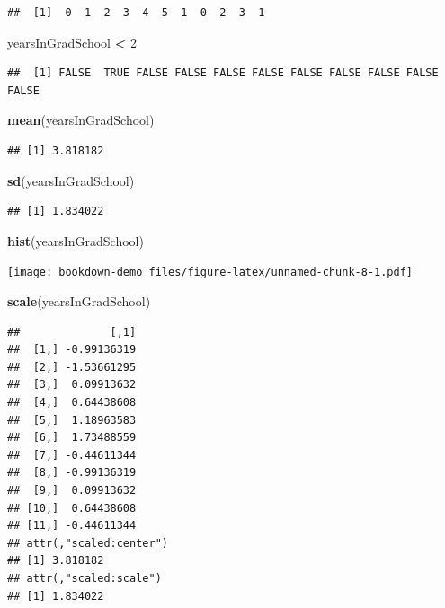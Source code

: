 \documentclass[]{book}
\newenvironment{Shaded}{\begin{snugshade}}{\end{snugshade}}
\newcommand{\KeywordTok}[1]{\textcolor[rgb]{0.13,0.29,0.53}{\textbf{#1}}}
\newcommand{\DecValTok}[1]{\textcolor[rgb]{0.00,0.00,0.81}{#1}}
\newcommand{\StringTok}[1]{\textcolor[rgb]{0.31,0.60,0.02}{#1}}
\newcommand{\OperatorTok}[1]{\textcolor[rgb]{0.81,0.36,0.00}{\textbf{#1}}}
\newcommand{\NormalTok}[1]{#1}
\theoremstyle{definition}
\theoremstyle{definition}
\theoremstyle{definition}
\theoremstyle{remark}
\begin{document}
\begin{verbatim}
##  [1]  0 -1  2  3  4  5  1  0  2  3  1
\end{verbatim}

\begin{Shaded}
\begin{Highlighting}[]
\NormalTok{yearsInGradSchool }\OperatorTok{<}\StringTok{ }\DecValTok{2}
\end{Highlighting}
\end{Shaded}

\begin{verbatim}
##  [1] FALSE  TRUE FALSE FALSE FALSE FALSE FALSE FALSE FALSE FALSE FALSE
\end{verbatim}

\begin{Shaded}
\begin{Highlighting}[]
\KeywordTok{mean}\NormalTok{(yearsInGradSchool)}
\end{Highlighting}
\end{Shaded}

\begin{verbatim}
## [1] 3.818182
\end{verbatim}

\begin{Shaded}
\begin{Highlighting}[]
\KeywordTok{sd}\NormalTok{(yearsInGradSchool)}
\end{Highlighting}
\end{Shaded}

\begin{verbatim}
## [1] 1.834022
\end{verbatim}

\begin{Shaded}
\begin{Highlighting}[]
\KeywordTok{hist}\NormalTok{(yearsInGradSchool)}
\end{Highlighting}
\end{Shaded}

\texttt{[image: bookdown-demo\_files/figure-latex/unnamed-chunk-8-1.pdf]}

\begin{Shaded}
\begin{Highlighting}[]
\KeywordTok{scale}\NormalTok{(yearsInGradSchool)}
\end{Highlighting}
\end{Shaded}

\begin{verbatim}
##              [,1]
##  [1,] -0.99136319
##  [2,] -1.53661295
##  [3,]  0.09913632
##  [4,]  0.64438608
##  [5,]  1.18963583
##  [6,]  1.73488559
##  [7,] -0.44611344
##  [8,] -0.99136319
##  [9,]  0.09913632
## [10,]  0.64438608
## [11,] -0.44611344
## attr(,"scaled:center")
## [1] 3.818182
## attr(,"scaled:scale")
## [1] 1.834022
\end{verbatim}
\end{document}
